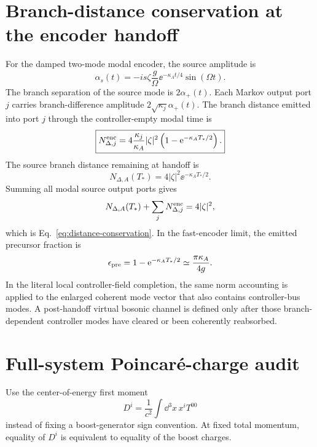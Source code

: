 \appendix

\section{Branch-distance conservation at the encoder handoff}
\label{app:handoff}

For the damped two-mode modal encoder, the source amplitude is
\begin{equation}
\alpha_s(t)=-is\zeta\frac{g}{\Omega}\ee^{-\kappa_A t/4}\sin(\Omega t).
\end{equation}
The branch separation of the source mode is $2\alpha_+(t)$. Each Markov output port $j$ carries branch-difference amplitude $2\sqrt{\kappa_j}\alpha_+(t)$. The branch distance emitted into port $j$ through the controller-empty modal time is
\begin{equation}
\boxed{
N_{\Delta,j}^{\rm enc}
=4\frac{\kappa_j}{\kappa_A}|\zeta|^2
\left(1-\mathrm{e}^{-\kappa_A T_*/2}\right).}
\end{equation}
The source branch distance remaining at handoff is
\begin{equation}
N_{\Delta,A}(T_*)=4|\zeta|^2\ee^{-\kappa_A T_*/2}.
\end{equation}
Summing all modal source output ports gives
\begin{equation}
N_{\Delta,A}(T_*)+
\sum_jN_{\Delta,j}^{\rm enc}=4|\zeta|^2,
\end{equation}
which is Eq.~\eqref{eq:distance-conservation}. In the fast-encoder limit, the emitted precursor fraction is
\begin{equation}
\epsilon_{\rm pre}
=1-\mathrm{e}^{-\kappa_A T_*/2}
\simeq\frac{\pi\kappa_A}{4g}.
\end{equation}
In the literal local controller-field completion, the same norm accounting is applied to the enlarged coherent mode vector that also contains controller-bus modes. A post-handoff virtual bosonic channel is defined only after those branch-dependent controller modes have cleared or been coherently reabsorbed.

\section{Full-system Poincar\'e-charge audit}
\label{app:charges}

Use the center-of-energy first moment
\begin{equation}
D^i=\frac1{c^2}\int\dd^3x\,x^iT^{00}
\end{equation}
instead of fixing a boost-generator sign convention. At fixed total momentum, equality of $D^i$ is equivalent to equality of the boost charges.


